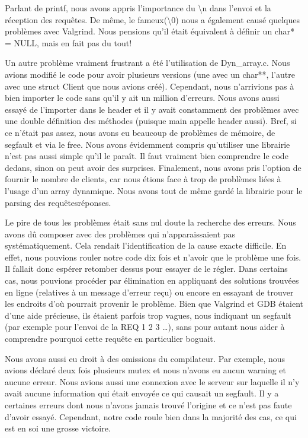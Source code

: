 \documentclass[11pt]{article}
\begin{document}
Parlant de printf, nous avons appris l’importance du \textbackslash n  dans l’envoi et la réception des requêtes. De même, le fameux(\textbackslash 0) nous a également causé quelques problèmes avec Valgrind. Nous pensions qu’il était équivalent à définir un char* = NULL, mais en fait pas du tout! 

Un autre problème vraiment frustrant a été l’utilisation de Dyn\_array.c. Nous avions modifié le code pour avoir plusieurs versions (une avec un char**, l’autre avec une struct Client que nous avions créé). Cependant, nous n’arrivions pas à bien importer le code sans qu’il y ait un million d’erreurs. Nous avons aussi essayé de l’importer dans le header et il y avait constamment des problèmes avec une double définition des méthodes (puisque main appelle header aussi). Bref, si ce n’était pas assez, nous avons eu beaucoup de problèmes de mémoire, de segfault et via le free. Nous avons évidemment compris qu’utiliser une librairie n’est pas aussi simple qu’il le paraît. Il faut vraiment bien comprendre le code dedans, sinon on peut avoir des surprises. Finalement, nous avons pris l’option de fournir le nombre de clients, car nous étions face à trop de problèmes liées à l’usage d’un array dynamique. Nous avons tout de même gardé la librairie pour le parsing des requêtes\/réponses.

Le pire de tous les problèmes était sans nul doute la recherche des erreurs. Nous avons dû composer avec des problèmes qui n'apparaissaient pas systématiquement. Cela rendait l'identification de la cause exacte difficile. En effet, nous pouvions rouler notre code dix fois et n’avoir que le problème une fois. Il fallait donc espérer retomber dessus pour essayer de le régler. Dans certains cas, nous pouvions procéder par élimination en appliquant des solutions trouvées en ligne (relatives à un message d’erreur reçu) ou encore en essayant de trouver les endroits d’où pourrait provenir le problème. Bien que Valgrind et GDB étaient d'une aide précieuse, ils étaient parfois trop vagues, nous indiquant un segfault (par exemple pour l’envoi de la REQ 1 2 3 …), sans pour autant nous aider à comprendre pourquoi cette requête en particulier boguait. 

Nous avons aussi eu droit à des omissions du compilateur. Par exemple, nous avions déclaré deux fois plusieurs mutex et nous n'avons eu aucun warning et aucune erreur. Nous avions aussi une connexion avec le serveur sur laquelle il n'y avait aucune information qui était envoyée ce qui causait un segfault. Il y a certaines erreurs dont nous n'avons jamais trouvé l'origine et ce n'est pas faute d'avoir essayé. Cependant, notre code roule bien dans la majorité des cas, ce qui est en soi une grosse victoire. 
\end{document}

